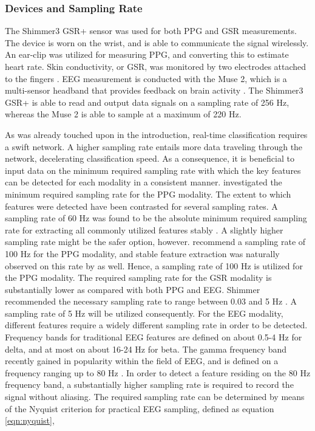 \documentclass[12pt]{article}
\begin{document}
\subsubsection{Devices and Sampling Rate}
The Shimmer3 GSR+ sensor was used for both PPG and GSR measurements. The device is worn on the wrist, and is able to communicate the signal wirelessly. An ear-clip was utilized for measuring PPG, and converting this to estimate heart rate. Skin conductivity, or GSR, was monitored by two electrodes attached to the fingers \cite{shimmer}. EEG measurement is conducted with the Muse 2, which is a multi-sensor headband that provides feedback on brain activity \cite{muse}. The Shimmer3 GSR+ is able to read and output data signals on a sampling rate of 256 Hz, whereas the Muse 2 is able to sample at a maximum of 220 Hz. 

As was already touched upon in the introduction, real-time classification requires a swift network. A higher sampling rate entails more data traveling through the network, decelerating classification speed. As a consequence, it is beneficial to input data on the minimum required sampling rate with which the key features can be detected for each modality in a consistent manner.  investigated the minimum required sampling rate for the PPG modality. The extent to which features were detected have been contrasted for several sampling rates. A sampling rate of 60 Hz was found to be the absolute minimum required sampling rate for extracting all commonly utilized features stably \cite{fujita2019evaluation}. A slightly higher sampling rate might be the safer option, however.  recommend a sampling rate of 100 Hz for the PPG modality, and stable feature extraction was naturally observed on this rate by  as well. Hence, a sampling rate of 100 Hz is utilized for the PPG modality. The required sampling rate for the GSR modality is substantially lower as compared with both PPG and EEG. Shimmer recommended the necessary sampling rate to range between 0.03 and 5 Hz \cite{shimmer}. A sampling rate of 5 Hz will be utilized consequently. For the EEG modality, different features require a widely different sampling rate in order to be detected. Frequency bands for traditional EEG features are defined on about 0.5-4 Hz for delta, and at most on about 16-24 Hz for beta. The gamma frequency band recently gained in popularity within the field of EEG, and is defined on a frequency ranging up to 80 Hz \cite{weiergraeber2016sampling}. In order to detect a feature residing on the 80 Hz frequency band, a substantially higher sampling rate is required to record the signal without aliasing. The required sampling rate can be determined by means of the Nyquist criterion for practical EEG sampling, defined as equation \ref{eqn:nyquist},
\end{document}
